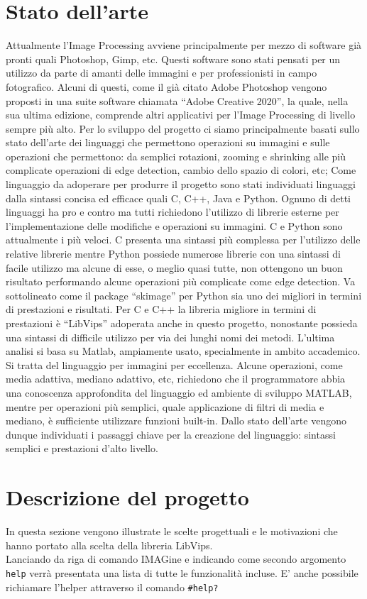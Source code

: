 \documentclass[10pt]{article}
\begin{document}
\section{Stato dell'arte}Attualmente l’Image Processing avviene principalmente per mezzo di software già pronti quali Photoshop, Gimp, etc. Questi software sono stati pensati per un utilizzo da parte di amanti delle immagini e per professionisti in campo fotografico. Alcuni di questi, come il già citato Adobe Photoshop vengono proposti in una suite software chiamata “Adobe Creative 2020”, la quale, nella sua ultima edizione, comprende altri applicativi per l’Image Processing di livello sempre più alto.
Per lo sviluppo del progetto ci siamo principalmente basati sullo stato dell’arte dei linguaggi che permettono operazioni su immagini e sulle operazioni che permettono: da semplici  rotazioni, zooming e shrinking alle più complicate operazioni di edge detection, cambio dello spazio di colori, etc;\newline
Come linguaggio da adoperare per produrre il progetto sono stati individuati linguaggi dalla sintassi concisa ed efficace quali C, C++, Java e Python. Ognuno di detti linguaggi ha pro e contro ma tutti richiedono l’utilizzo di librerie esterne per l’implementazione delle modifiche e operazioni su immagini. C e Python sono attualmente i più veloci. C presenta una sintassi più complessa per l’utilizzo delle relative librerie mentre Python possiede numerose librerie con una sintassi di facile utilizzo ma alcune di esse, o meglio quasi tutte, non ottengono un buon risultato performando alcune operazioni più complicate come edge detection. Va sottolineato come il package “skimage” per Python sia uno dei migliori in termini di prestazioni e risultati. Per C e C++ la libreria migliore in termini di prestazioni è “LibVips” adoperata anche in questo progetto, nonostante possieda una sintassi di difficile utilizzo per via dei lunghi nomi dei metodi. L’ultima analisi si basa su Matlab, ampiamente usato, specialmente in ambito accademico. Si tratta del linguaggio per immagini per eccellenza. Alcune operazioni, come media adattiva, mediano adattivo, etc, richiedono che il programmatore abbia una conoscenza approfondita del linguaggio ed ambiente di sviluppo MATLAB, mentre per operazioni più semplici, quale applicazione di filtri di media e mediano, è sufficiente utilizzare funzioni built-in.
Dallo stato dell’arte vengono dunque individuati i passaggi chiave per la creazione del linguaggio: sintassi semplici e prestazioni d’alto livello.
\clearpage
\section{Descrizione del progetto}In questa sezione vengono illustrate le scelte progettuali e le motivazioni che hanno portato alla scelta della libreria LibVips.\\
Lanciando da riga di comando IMAGine e indicando come secondo argomento \texttt{help} verrà presentata una lista di tutte le funzionalità incluse. E' anche possibile richiamare l'helper attraverso il comando \texttt{\#help?}
\end{document}
